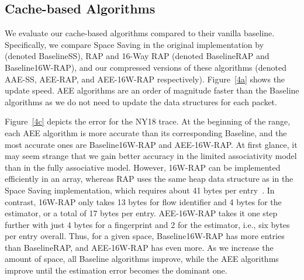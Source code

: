 



\subsection{Cache-based Algorithms}
We evaluate our cache-based algorithms compared to their vanilla baseline. Specifically, we compare Space Saving in the original implementation by~\cite{SpaceSavingIsTheBest} (denoted BaselineSS), 
RAP and 16-Way RAP (denoted BaselineRAP and Baseline16W-RAP), and our compressed versions of these algorithms (denoted AAE-SS, AEE-RAP, and AEE-16W-RAP respectively). 
Figure~\ref{4a} shows the update speed. AEE algorithms are an order of magnitude faster than the Baseline algorithms as we do not {need to update the data structures for each packet.}

Figure~\ref{4c}
depicts the error for the NY18 trace. 
At the beginning of the range, each AEE algorithm is more accurate than its corresponding Baseline, and the most accurate ones are Baseline16W-RAP and AEE-16W-RAP. 
At first glance, it may seem strange that we gain better accuracy in the limited associativity model than in the fully associative model. 
However, 16W-RAP can be implemented efficiently in an array, whereas RAP uses the same heap data structure as in the Space Saving implementation,
which requires about 41 bytes per entry~\cite{CormodeCode}. In contrast, 16W-RAP only takes 13 bytes for flow identifier and 4 bytes for the estimator, or a total of 17 bytes per entry. AEE-16W-RAP takes it one step further with just 4 bytes for a fingerprint and 2 for the estimator, i.e., six bytes per entry overall.
Thus, for a given space, Baseline16W-RAP %
has more entries than BaselineRAP, and AEE-16W-RAP has even more. 
As we increase the amount of space, all Baseline algorithms improve, while the AEE algorithms improve until the estimation error becomes the dominant one. 

